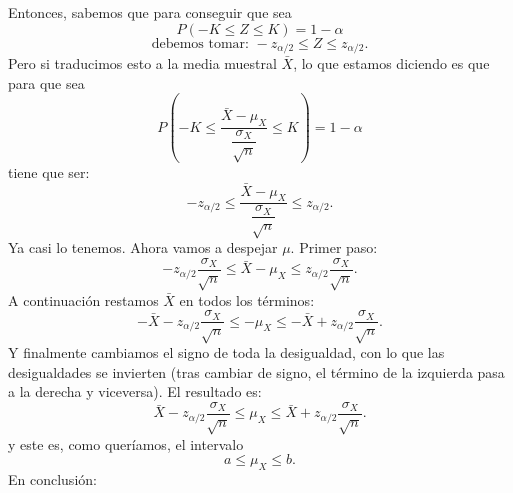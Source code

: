 \begin{itemize}
       Entonces, sabemos que para conseguir que sea
       \[P(-K\leq Z\leq K)=1-\alpha\]
       \[\mbox{debemos tomar: }-z_{\alpha/2}\leq Z\leq z_{\alpha/2}.\]
       Pero si traducimos esto a la media muestral $\bar X$, lo que estamos diciendo es que para que sea
       \[P\left(-K\leq \dfrac{\bar X-\mu_X}{\dfrac{\sigma_X}{\sqrt{n}}}\leq K\right)=1-\alpha\]
       tiene que ser:
       \[-z_{\alpha/2}\leq \dfrac{\bar X-\mu_X}{\dfrac{\sigma_X}{\sqrt{n}}} \leq z_{\alpha/2}.\]
       Ya casi lo tenemos. Ahora vamos a despejar $\mu$. Primer paso:
       \[-z_{\alpha/2}\dfrac{\sigma_X}{\sqrt{n}}\leq {\bar X-\mu_X} \leq z_{\alpha/2}\dfrac{\sigma_X}{\sqrt{n}}.\]
       A continuación restamos $\bar X$ en todos los términos:
       \[-\bar X-z_{\alpha/2}\dfrac{\sigma_X}{\sqrt{n}}\leq -\mu_X \leq -\bar X+z_{\alpha/2}\dfrac{\sigma_X}{\sqrt{n}}.\]
       Y finalmente cambiamos el signo de toda la desigualdad, con lo que las desigualdades se invierten (tras cambiar de signo, el término de la izquierda pasa a la derecha y viceversa). El resultado es:
       \[\bar X-z_{\alpha/2}\dfrac{\sigma_X}{\sqrt{n}}\leq \mu_X \leq \bar X+z_{\alpha/2}\dfrac{\sigma_X}{\sqrt{n}}.\]
       y este es, como queríamos, el intervalo \[a\leq \mu_X\leq b.\]
       En conclusión:\\[3mm]
       \\[3mm]


\end{itemize}
